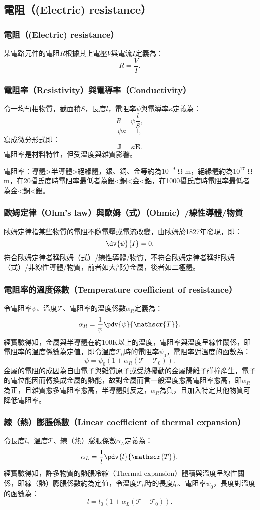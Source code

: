 \documentclass[a4paper,12pt]{report}
\begin{document}
\begin{itemize}
\subsection{電阻（(Electric) resistance）}
\subsubsection{電阻（(Electric) resistance）}
某電路元件的電阻$R$根據其上電壓$V$與電流$I$定義為：
\[R=\frac{V}{I}.\]
\subsubsection{電阻率（Resistivity）與電導率（Conductivity）}
令一均勻相物質，截面積$S$，長度$l$，電阻率$\psi$與電導率$\kappa$定義為：
\[R=\psi\frac{l}{S},\]
\[\psi\kappa=1,\]
寫成微分形式即：
\[\mathbf{J}=\kappa\mathbf{E}.\]
電阻率是材料特性，但受溫度與雜質影響。

電阻率：導體>半導體>絕緣體，銀、銅、金等約為$10^{-9}$ Ω m，絕緣體約為$10^{17}$ Ω m，在20攝氏度時電阻率最低者為銀<銅<金<鋁，在1000攝氏度時電阻率最低者為金<銅<銀。
\subsubsection{歐姆定律（Ohm's law）與歐姆（式）（Ohmic）/線性導體/物質}
歐姆定律指某些物質的電阻不隨電壓或電流改變，由歐姆於1827年發現，即：
\[\dv{\psi}{I}=0.\]
符合歐姆定律者稱歐姆（式）/線性導體/物質，不符合歐姆定律者稱非歐姆（式）/非線性導體/物質，前者如大部分金屬，後者如二極體。
\subsubsection{電阻率的溫度係數（Temperature coefficient of resistance）}
令電阻率$\psi$、溫度$\mathscr{T}$、電阻率的溫度係數$\alpha_R$定義為：
\[\alpha_R=\frac{1}{\psi}\pdv{\psi}{\mathscr{T}}.\]
經實驗得知，金屬與半導體在約100K以上的溫度，電阻率與溫度呈線性關係，即電阻率的溫度係數為定值，即令溫度$\mathscr{T}_0$時的電阻率$\psi_0$，電阻率對溫度的函數為：
\[\psi=\psi_0(1+\alpha_R(\mathscr{T}-\mathscr{T}_0)).\]
金屬的電阻的成因為自由電子與雜質原子或受熱擾動的金屬陽離子碰撞產生，電子的電位能因而轉換成金屬的熱能，故對金屬而言一般溫度愈高電阻率愈高，即$\alpha_R$為正，且雜質愈多電阻率愈高，半導體則反之，$\alpha_R$為負，且加入特定其他物質可降低電阻率。
\subsubsection{線（熱）膨脹係數（Linear coefficient of thermal expansion）}
令長度$l$、溫度$\mathscr{T}$、線（熱）膨脹係數$\alpha_L$定義為：
\[\alpha_L=\frac{1}{l}\pdv{l}{\mathscr{T}}.\]
經實驗得知，許多物質的熱脹冷縮（Thermal expansion）體積與溫度呈線性關係，即線（熱）膨脹係數約為定值，令溫度$\mathscr{T}_0$時的長度$l_0$、電阻率$\psi_0$，長度對溫度的函數為：
\[ l= l_0(1+\alpha_L(\mathscr{T}-\mathscr{T}_0)).\]

\end{itemize}
\end{document}
